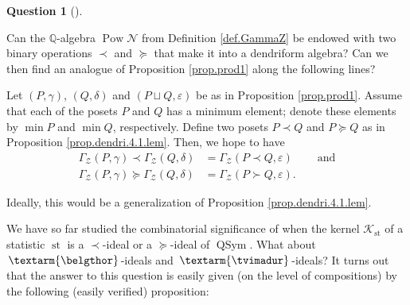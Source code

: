 \documentclass[numbers=enddot,12pt,final,onecolumn,notitlepage]{scrartcl}%
\theoremstyle{definition}
\newtheorem{quest}[theo]{Question}
\newenvironment{question}[1][]
{\begin{quest}[#1]\begin{leftbar}}
{\end{leftbar}\end{quest}}
\newenvironment{question}[1][Question]{\noindent\textbf{#1.} }{\ \rule{0.5em}{0.5em}}
\newcommand{\tvi}{\left. \textarm{\tvimadur} \right.}
\newcommand{\bel}{\left. \textarm{\belgthor} \right.}
\begin{document}
\begin{question}
Can the $\mathbb{Q}$-algebra $\operatorname*{Pow}\mathcal{N}$ from Definition
\ref{def.GammaZ} be endowed with two binary operations $\left.  \prec\right.
$ and $\left.  \succeq\right.  $ that make it into a dendriform algebra? Can
we then find an analogue of Proposition \ref{prop.prod1} along the following lines?

Let $\left(  P,\gamma\right)  $, $\left(  Q,\delta\right)  $ and $\left(
P\sqcup Q,\varepsilon\right)  $ be as in Proposition \ref{prop.prod1}. Assume
that each of the posets $P$ and $Q$ has a minimum element; denote these
elements by $\min P$ and $\min Q$, respectively. Define two posets $P\left.
\prec\right.  Q$ and $P\left.  \succeq\right.  Q$ as in Proposition
\ref{prop.dendri.4.1.lem}. Then, we hope to have%
\begin{align*}
\Gamma_{\mathcal{Z}}\left(  P,\gamma\right)  \left.  \prec\right.
\Gamma_{\mathcal{Z}}\left(  Q,\delta\right)   &  =\Gamma_{\mathcal{Z}}\left(
P\left.  \prec\right.  Q,\varepsilon\right)  \ \ \ \ \ \ \ \ \ \ \text{and}\\
\Gamma_{\mathcal{Z}}\left(  P,\gamma\right)  \left.  \succeq\right.
\Gamma_{\mathcal{Z}}\left(  Q,\delta\right)   &  =\Gamma_{\mathcal{Z}}\left(
P\left.  \succ\right.  Q,\varepsilon\right)  .
\end{align*}


Ideally, this would be a generalization of Proposition
\ref{prop.dendri.4.1.lem}.
\end{question}

We have so far studied the combinatorial significance of when the kernel
$\mathcal{K}_{\operatorname*{st}}$ of a statistic $\operatorname*{st}$ is a
$\left.  \prec\right.  $-ideal or a $\left.  \succeq\right.  $-ideal of
$\operatorname*{QSym}$. What about $\bel$-ideals and $\tvi$-ideals? It turns
out that the answer to this question is easily given (on the level of
compositions) by the following (easily verified) proposition:
\end{document}
